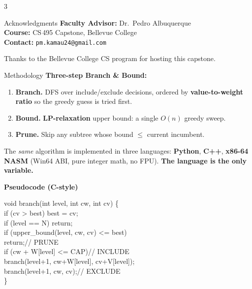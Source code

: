 \documentclass[a0,portrait]{a0poster}
\newcommand{\kw}[1]{\textcolor{BCDarkBlue}{\textbf{#1}}}
\newcommand{\KW}[1]{\textcolor{BCRed}{\textbf{#1}}}
\begin{document}
\begin{multicols}{3}
\begin{posterblock}{Acknowledgments}
\textbf{Faculty Advisor:} Dr.~Pedro Albuquerque \\
\textbf{Course:} CS\,495 Capstone, Bellevue College \\
\textbf{Contact:} \texttt{pm.kamau24@gmail.com}

\vspace{0.3em}
Thanks to the Bellevue College CS program for hosting this capstone.
\end{posterblock}

\columnbreak

\begin{posterblock}{Methodology}
\textbf{Three-step Branch \& Bound:}
\begin{enumerate}[leftmargin=1.6em,itemsep=4pt,topsep=4pt]
  \item \KW{Branch.} DFS over include/exclude decisions, ordered by \kw{value-to-weight ratio} so the greedy guess is tried first.
  \item \KW{Bound.} \kw{LP-relaxation} upper bound: a single $O(n)$ greedy sweep.
  \item \KW{Prune.} Skip any subtree whose bound $\le$ current incumbent.
\end{enumerate}

\vspace{0.4em}
\begin{callout}
The \emph{same} algorithm is implemented in three languages: \kw{Python}, \kw{C++}, \kw{x86-64 NASM} (Win64 ABI, pure integer math, no FPU). \KW{The language is the only variable.}
\end{callout}

\vspace{0.3em}
\textbf{Pseudocode (C-style)}\\[2pt]
{\ttfamily\small
void branch(int level, int cw, int cv) \{\\
\hspace*{1em}if (cv > best) best = cv;\\
\hspace*{1em}if (level == N) return;\\
\hspace*{1em}if (upper\_bound(level, cw, cv) <= best)\\
\hspace*{2em}return;\hfill\textcolor{BCRed}{// PRUNE}\\
\hspace*{1em}if (cw + W[level] <= CAP)\hfill\textcolor{BCRed}{// INCLUDE}\\
\hspace*{2em}branch(level+1, cw+W[level], cv+V[level]);\\
\hspace*{1em}branch(level+1, cw, cv);\hfill\textcolor{BCRed}{// EXCLUDE}\\
\}\par}
\end{posterblock}


\end{multicols}
\end{document}
